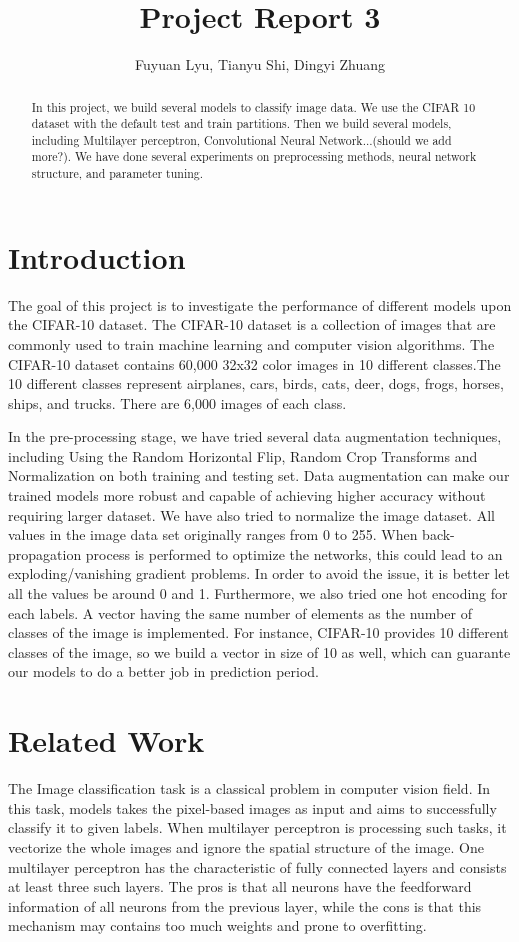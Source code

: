 \documentclass[11pt]{scrartcl}
\title{Project Report 3}
\author{Fuyuan Lyu, Tianyu Shi, Dingyi Zhuang}
\begin{document}
\maketitle

\begin{abstract}
In this project, we build several models to classify image data. We use the CIFAR 10 dataset with the default test and train partitions.
Then we build several models, including Multilayer perceptron, Convolutional Neural Network...(should we add more?). We have done several experiments on preprocessing methods, neural network structure, and parameter tuning.
\end{abstract}
  
\section{Introduction}
The goal of this project is to investigate the performance of different models upon the CIFAR-10 dataset. The CIFAR-10 dataset is a collection of images that are commonly used to train machine learning and computer vision algorithms. The CIFAR-10 dataset contains 60,000 32x32 color images in 10 different classes.The 10 different classes represent airplanes, cars, birds, cats, deer, dogs, frogs, horses, ships, and trucks. There are 6,000 images of each class.

In the pre-processing stage, we have tried several data augmentation techniques, including Using the Random Horizontal Flip, Random Crop Transforms and Normalization on both training and testing set. Data augmentation can make our trained models more robust and capable of achieving higher accuracy without requiring larger dataset.
We have also tried to normalize the image dataset. All values in the image data set originally ranges from 0 to 255. When back-propagation process is performed to optimize the networks, this could lead to an exploding/vanishing gradient problems. In order to avoid the issue, it is better let all the values be around 0 and 1.
Furthermore, we also tried one hot encoding for each labels. A vector having the same number of elements as the number of classes of the image is implemented. For instance, CIFAR-10 provides 10 different classes of the image, so we build a vector in size of 10 as well, which can guarante our models to do a better job in prediction period.



\section{Related Work}
The Image classification task is a classical problem in computer vision field. In this task, models takes the pixel-based images as input and aims to successfully classify it to given labels. When multilayer perceptron is processing such tasks, it vectorize the whole images and ignore the spatial structure of the image. One multilayer perceptron has the characteristic of fully connected layers and consists at least three such layers. The pros is that all neurons have the feedforward information of all neurons from the previous layer, while the cons is that this mechanism may contains too much weights and prone to overfitting.
\end{document}
